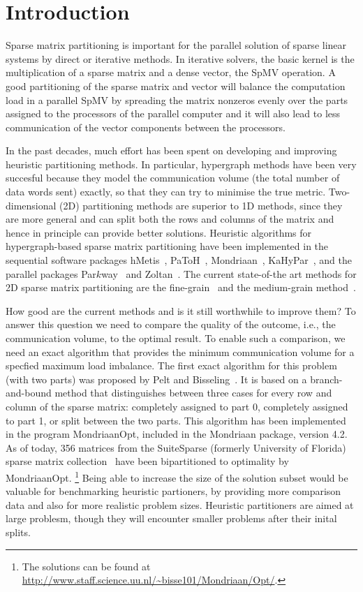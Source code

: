 \section{Introduction}
\label{sec:intro}
Sparse matrix partitioning is important for the parallel solution of sparse linear systems
by direct or iterative methods. In iterative solvers, the basic kernel is the multiplication
of a sparse matrix and a dense vector, the SpMV operation. A good partitioning of the sparse matrix
and vector will balance the computation load in a parallel SpMV by spreading the
matrix nonzeros evenly over the parts assigned to the processors 
of the parallel computer and it will also
lead to less communication of the vector components between the processors.

In the past decades, much effort has been spent on developing and improving
heuristic partitioning methods. In particular, hypergraph methods have been very
succesful because they model the communication volume (the total
number of data words sent) exactly, so that they can try to minimise the true metric.
Two-dimensional (2D) partitioning methods are superior to 1D methods,
since they are more general and can split both the rows and columns of the matrix and
hence in principle can provide better solutions.
Heuristic algorithms for hypergraph-based sparse matrix partitioning
have been implemented in the sequential software packages hMetis~\cite{karypis99b},
PaToH~\cite{catalyurek99}, Mondriaan~\cite{vastenhouw05}, KaHyPar~\cite{akhremtsev17},
and the parallel packages Par$k$way~\cite{trifunovic08} and Zoltan~\cite{devine06}.
The current state-of-the art methods for 2D sparse matrix partitioning are the fine-grain~\cite{catalyurek01}
and the medium-grain method~\cite{pelt14}. 

How good are the current methods and is it still worthwhile to improve them?
To answer this question we need to compare the quality of the outcome,
i.e., the communication volume, to the optimal result.
To enable such a comparison, we need an exact algorithm that provides the 
minimum communication volume for a specfied maximum load imbalance.
The first exact algorithm for this problem (with two parts)
was proposed by Pelt and Bisseling~\cite{pelt15}.
It is based on a branch-and-bound method that distinguishes  between
three cases for every row and column of the sparse matrix:
completely assigned to part 0, completely assigned to part 1, 
or split between the two parts. This algorithm has been implemented
in the program MondriaanOpt, included in the Mondriaan package,
version 4.2. As of today, 356 matrices from the SuiteSparse 
(formerly University of Florida) sparse matrix collection~\cite{davis11}
have been bipartitioned to optimality by MondriaanOpt. 
\footnote{The solutions can be found at
\url{http://www.staff.science.uu.nl/~bisse101/Mondriaan/Opt/}.}
Being able to increase the size of the solution subset would be valuable
for benchmarking heuristic partioners, by providing more comparison data and also  
for more realistic problem sizes. Heuristic partitioners are aimed at large 
problesm, though they will encounter smaller problems after their inital splits.

